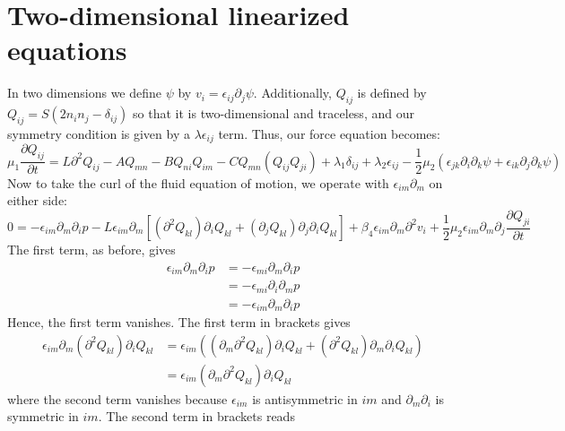 \documentclass[reqno]{article}
\begin{document}
	\section{Two-dimensional linearized equations}
	In two dimensions we define $\psi$ by $v_i = \epsilon_{ij} \partial_j \psi$. Additionally, $Q_{ij}$ is defined by $Q_{ij} = S(2n_i n_j - \delta_{ij})$ so that it is two-dimensional and traceless, and our symmetry condition is given by a $\lambda \epsilon_{ij}$ term. Thus, our force equation becomes:
	\begin{equation} \label{eq:2DForce}
		\mu_1 \frac{\partial Q_{ij}}{\partial t} = L\partial^2 Q_{ij} - A Q_{mn} - B Q_{ni}Q_{im} - C Q_{mn}(Q_{ij}Q_{ji}) + \lambda_1 \delta_{ij} + \lambda_2 \epsilon_{ij} - \frac{1}{2}\mu_2(\epsilon_{jk}\partial_i\partial_k \psi + \epsilon_{ik}\partial_j \partial_k \psi)
	\end{equation}
	Now to take the curl of the fluid equation of motion, we operate with $\epsilon_{im}\partial_m$ on either side:
	\begin{equation}
		0 = -\epsilon_{im}\partial_m\partial_i p -  L\epsilon_{im}\partial_m \left[(\partial^2 Q_{kl}) \partial_i Q_{kl} + (\partial_j Q_{kl}) \partial_j \partial_i Q_{kl}\right] + \beta_4 \epsilon_{im}\partial_m\partial^2 v_i + \frac{1}{2} \mu_2 \epsilon_{im}\partial_m \partial_j \frac{\partial Q_{ji}}{\partial t}
	\end{equation}
	The first term, as before, gives
	\begin{equation}
	\begin{split}
		\epsilon_{im}\partial_m\partial_i p &= -\epsilon_{mi}\partial_m \partial_i p \\
		&= -\epsilon_{mi}\partial_i\partial_m p \\
		&= -\epsilon_{im}\partial_m\partial_i p
	\end{split}
	\end{equation}
	Hence, the first term vanishes. The first term in brackets gives
	\begin{equation}
	\begin{split}
		\epsilon_{im}\partial_m\left(\partial^2 Q_{kl}\right)\partial_i Q_{kl} &= \epsilon_{im}\left( \left( \partial_m \partial^2 Q_{kl} \right)\partial_i Q_{kl} + \left( \partial^2 Q_{kl} \right)\partial_m\partial_i Q_{kl} \right) \\
		&= \epsilon_{im} \left(\partial_m \partial^2 Q_{kl}\right)\partial_i Q_{kl}
	\end{split}
	\end{equation}
	where the second term vanishes because $\epsilon_{im}$ is antisymmetric in $im$ and $\partial_m\partial_i$ is symmetric in $im$. The second term in brackets reads
\end{document}
